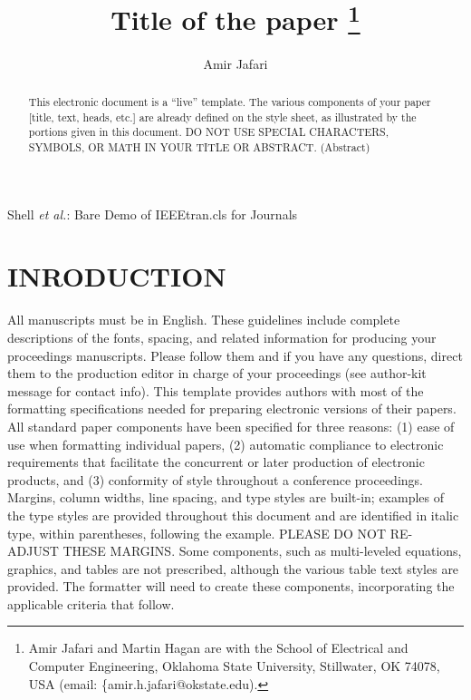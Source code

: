 \documentclass[journal]{IEEEtran}
\begin{document}
\raggedbottom

\title{\ \\ \LARGE\bf Title of the paper \thanks{Amir Jafari and Martin Hagan are with the School of Electrical and Computer Engineering, Oklahoma State University, Stillwater, OK 74078, USA (email: \{amir.h.jafari@okstate.edu).}}

\author{Amir Jafari}
%
{Shell \MakeLowercase{\textit{et al.}}: Bare Demo of IEEEtran.cls for Journals}
\maketitle

\begin{abstract}
This electronic document is a “live” template. The various components of your paper [title, text, heads, etc.] are already defined on the style sheet, as illustrated by the portions given in this document. DO NOT USE SPECIAL CHARACTERS, SYMBOLS, OR MATH IN YOUR TITLE OR ABSTRACT. (Abstract)
\end{abstract}
\section{INRODUCTION}

All manuscripts must be in English. These guidelines include complete descriptions of the fonts, spacing, and related information for producing your proceedings manuscripts. Please follow them and if you have any questions, direct them to the production editor in charge of your proceedings (see author-kit message for contact info).
This template provides authors with most of the formatting specifications needed for preparing electronic versions of their papers. All standard paper components have been specified for three reasons: (1) ease of use when formatting individual papers, (2) automatic compliance to electronic requirements that facilitate the concurrent or later production of electronic products, and (3) conformity of style throughout a conference proceedings. Margins, column widths, line spacing, and type styles are built-in; examples of the type styles are provided throughout this document and are identified in italic type, within parentheses, following the example. PLEASE DO NOT RE-ADJUST THESE MARGINS. Some components, such as multi-leveled equations, graphics, and tables are not prescribed, although the various table text styles are provided. The formatter will need to create these components, incorporating the applicable criteria that follow.
\end{document}
